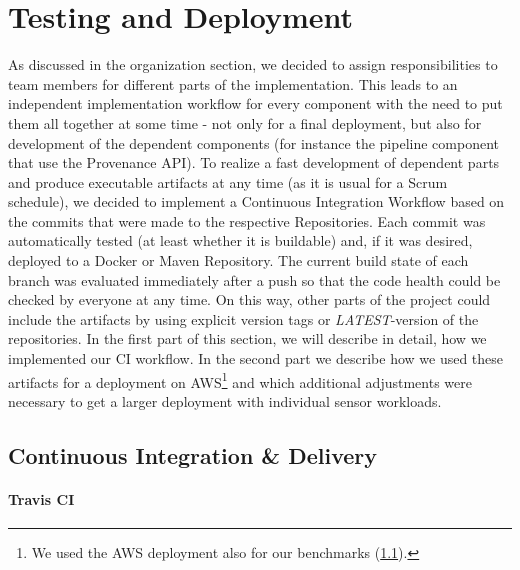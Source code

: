 \section{Testing and Deployment}
As discussed in the organization section, we decided to assign responsibilities to team members for different parts of the implementation.
This leads to an independent implementation workflow for every component with the need to put them all together at some time - not only for a final deployment, but also for development of the dependent components (for instance the pipeline component that use the Provenance API).
To realize a fast development of dependent parts and produce executable artifacts at any time (as it is usual for a Scrum schedule), we decided to implement a Continuous Integration Workflow based on the commits that were made to the respective Repositories. Each commit was automatically tested (at least whether it is buildable) and, if it was desired, deployed to a Docker or Maven Repository. The current build state of each branch was evaluated immediately after a push so that the code health could be checked by everyone at any time.
On this way, other parts of the project could include the artifacts by using explicit version tags or \emph{LATEST}-version of the repositories. In the first part of this section, we will describe in detail, how we implemented our CI workflow. In the second part we describe how we used these artifacts for a deployment on AWS\footnote{We used the AWS deployment also for our benchmarks (\ref{}).} and which additional adjustments were necessary to get a larger deployment with individual sensor workloads.

\subsection{Continuous Integration \& Delivery}

\paragraph*{Travis CI}
%

